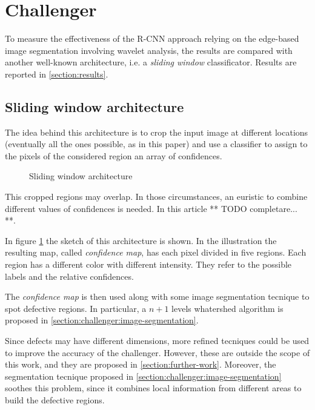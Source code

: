 \section{Challenger}\label{section:challenger}
    \par{
        To measure the effectiveness of the R-CNN approach relying on the edge-based image segmentation involving wavelet analysis, the results are compared with another well-known architecture, i.e. a \emph{sliding window} classificator. Results are reported in \ref{section:results}.
    }
    \subsection{Sliding window architecture}
        \par{
            The idea behind this architecture is to crop the input image at different locations (eventually all the ones possible, as in this paper) and use a classifier to assign to the pixels of the considered region an array of confidences.
        }
        \begin{figure}
            \centering
            \caption{Sliding window architecture}\label{fig:sliding-window}
        \end{figure}
        \par{
            This cropped regions may overlap. In those circumstances, an euristic to combine different values of confidences is needed. In this article ** TODO completare... **.
        }
        \par{
            In figure \ref{fig:sliding-window} the sketch of this architecture is shown. In the illustration the resulting map, called \emph{confidence map}, has each pixel divided in five regions. Each region has a different color with different intensity. They refer to the possible labels and the relative confidences. 
        }
        \par{
            The \emph{confidence map} is then used along with some image segmentation tecnique to spot defective regions. In particular, a $n+1$ levels whatershed algorithm is proposed in \ref{section:challenger:image-segmentation}.
        }
        \par{
            Since defects may have different dimensions, more refined tecniques could be used to improve the accuracy of the challenger. However, these are outside the scope of this work, and they are proposed in \ref{section:further-work}. Moreover, the segmentation tecnique proposed in \ref{section:challenger:image-segmentation} soothes this problem, since it combines local information from different areas to build the defective regions.
        }
